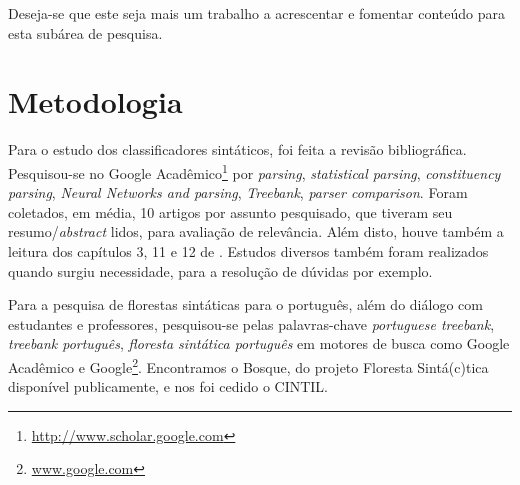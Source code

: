 Deseja-se que este seja mais um trabalho a acrescentar e fomentar conteúdo para esta subárea de pesquisa.


\section{Metodologia}\label{sec:metodologia}



Para o estudo dos classificadores sintáticos, foi feita a revisão bibliográfica. Pesquisou-se no Google Acadêmico\footnote{\url{http://www.scholar.google.com}} por \textit{parsing}, \textit{statistical parsing}, \textit{constituency parsing}, \textit{Neural Networks and parsing}, \textit{Treebank}, \textit{parser comparison}. Foram coletados, em média, 10 artigos por assunto pesquisado, que tiveram seu resumo/\textit{abstract} lidos, para avaliação de relevância. Além disto, houve também a leitura dos capítulos 3, 11 e 12 de . Estudos diversos também foram realizados quando surgiu necessidade, para a resolução de dúvidas por exemplo.

Para a pesquisa de florestas sintáticas para o português, além do diálogo com estudantes e professores, pesquisou-se pelas palavras-chave \textit{portuguese treebank}, \textit{treebank português}, \textit{floresta sintática português} em motores de busca como Google Acadêmico e Google\footnote{\url{www.google.com}}. Encontramos o Bosque, do projeto Floresta Sintá(c)tica disponível publicamente, e nos foi cedido o CINTIL.

